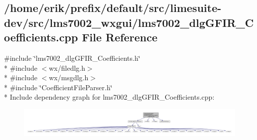 \subsection{/home/erik/prefix/default/src/limesuite-\/dev/src/lms7002\+\_\+wxgui/lms7002\+\_\+dlg\+G\+F\+I\+R\+\_\+\+Coefficients.cpp File Reference}
\label{lms7002__dlgGFIR__Coefficients_8cpp}
{\ttfamily \#include \char`\"{}lms7002\+\_\+dlg\+G\+F\+I\+R\+\_\+\+Coefficients.\+h\char`\"{}}\\*
{\ttfamily \#include $<$wx/filedlg.\+h$>$}\\*
{\ttfamily \#include $<$wx/msgdlg.\+h$>$}\\*
{\ttfamily \#include \char`\"{}Coefficient\+File\+Parser.\+h\char`\"{}}\\*
Include dependency graph for lms7002\+\_\+dlg\+G\+F\+I\+R\+\_\+\+Coefficients.\+cpp\+:
\nopagebreak
\begin{figure}[H]
\begin{center}
\leavevmode
\includegraphics[width=350pt]{d8/d7c/lms7002__dlgGFIR__Coefficients_8cpp__incl}
\end{center}
\end{figure}
